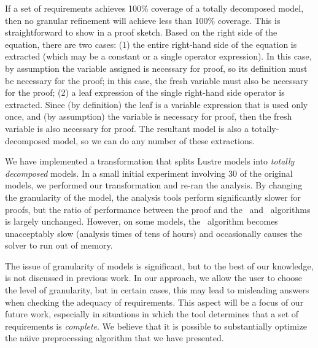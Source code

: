 If a set of requirements achieves 100\% coverage of a totally decomposed model, then no granular refinement will achieve less than 100\% coverage.  This is straightforward to show in a proof sketch.  Based on the right side of the equation, there are two cases: (1) the entire right-hand side of the equation is extracted (which may be a constant or a single operator expression). In this case, by assumption the variable assigned is necessary for proof, so its definition must be necessary for the proof; in this case, the fresh variable must also be necessary for the proof; (2) a leaf expression of the single right-hand side operator is extracted.  Since (by definition) the leaf is a variable expression that is used only once, and (by assumption) the variable is necessary for proof, then the fresh variable is also necessary for proof.  The resultant model is also a totally-decomposed model, so we can do any number of these extractions.

We have implemented a transformation that splits Lustre models into {\em totally decomposed} models.  In a small initial experiment involving 30 of the original models, we performed our transformation and re-ran the analysis.  By changing the granularity of the model, the analysis tools perform significantly slower for proofs, but the ratio of performance between the proof and the \ucalg\ and \mustalg\ algorithms is largely unchanged.  However, on some models, the \mustalg\ algorithm becomes unacceptably slow (analysis times of tens of hours) and occasionally causes the solver to run out of memory.

The issue of granularity of models is significant, but to the best of our knowledge, is not discussed in previous work.  In our approach, we allow the user to choose the level of granularity, but in certain cases, this may lead to misleading answers when checking the adequacy of requirements.  This aspect will be a focus of our future work, especially in situations in which the tool determines that a set of requirements is {\em complete}.  We believe that it is possible to substantially optimize the n{\"a}ive preprocessing algorithm that we have presented.

